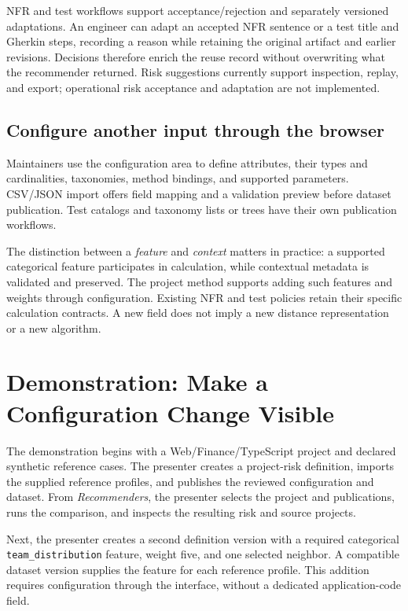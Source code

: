 \documentclass[10pt,conference]{IEEEtran}
\begin{document}
NFR and test workflows support acceptance/rejection and separately versioned adaptations. An engineer can adapt an accepted NFR sentence or a test title and Gherkin steps, recording a reason while retaining the original artifact and earlier revisions. Decisions therefore enrich the reuse record without overwriting what the recommender returned. Risk suggestions currently support inspection, replay, and export; operational risk acceptance and adaptation are not implemented.

\subsection{Configure another input through the browser}
Maintainers use the configuration area to define attributes, their types and cardinalities, taxonomies, method bindings, and supported parameters. CSV/JSON import offers field mapping and a validation preview before dataset publication. Test catalogs and taxonomy lists or trees have their own publication workflows.

The distinction between a \textit{feature} and \textit{context} matters in practice: a supported categorical feature participates in calculation, while contextual metadata is validated and preserved. The project method supports adding such features and weights through configuration. Existing NFR and test policies retain their specific calculation contracts. A new field does not imply a new distance representation or a new algorithm.

\section{Demonstration: Make a Configuration Change Visible}
\label{sec:demo}
The demonstration begins with a Web/Finance/TypeScript project and declared synthetic reference cases. The presenter creates a project-risk definition, imports the supplied reference profiles, and publishes the reviewed configuration and dataset. From \textit{Recommenders}, the presenter selects the project and publications, runs the comparison, and inspects the resulting risk and source projects.

Next, the presenter creates a second definition version with a required categorical \texttt{team\_distribution} feature, weight five, and one selected neighbor. A compatible dataset version supplies the feature for each reference profile. This addition requires configuration through the interface, without a dedicated application-code field.
\end{document}

